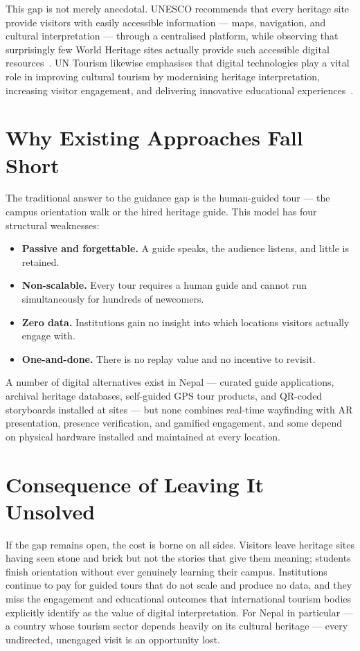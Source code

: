 This gap is not merely anecdotal. UNESCO recommends that every heritage site
provide visitors with easily accessible information --- maps, navigation, and
cultural interpretation --- through a centralised platform, while observing
that surprisingly few World Heritage sites actually provide such accessible
digital
resources~\cite{unescotoolkit}.
UN Tourism likewise emphasises that digital technologies play a vital role
in improving cultural tourism by modernising heritage interpretation,
increasing visitor engagement, and delivering innovative educational
experiences~\cite{unwto2018}.

\section{Why Existing Approaches Fall Short}
The traditional answer to the guidance gap is the human-guided tour --- the
campus orientation walk or the hired heritage guide. This model has four
structural weaknesses:

\begin{itemize}
  \item \textbf{Passive and forgettable.} A guide speaks, the audience
        listens, and little is retained.
  \item \textbf{Non-scalable.} Every tour requires a human guide and cannot
        run simultaneously for hundreds of newcomers.
  \item \textbf{Zero data.} Institutions gain no insight into which
        locations visitors actually engage with.
  \item \textbf{One-and-done.} There is no replay value and no incentive to
        revisit.
\end{itemize}

A number of digital alternatives exist in Nepal --- curated guide
applications, archival heritage databases, self-guided GPS tour products,
and QR-coded storyboards installed at sites --- but none combines real-time
wayfinding with AR presentation, presence verification, and gamified
engagement, and some depend on physical hardware installed and maintained at
every location.

\section{Consequence of Leaving It Unsolved}
If the gap remains open, the cost is borne on all sides. Visitors leave
heritage sites having seen stone and brick but not the stories that give
them meaning; students finish orientation without ever genuinely learning
their campus. Institutions continue to pay for guided tours that do not
scale and produce no data, and they miss the engagement and educational
outcomes that international tourism bodies explicitly identify as the value
of digital interpretation. For Nepal in particular --- a country whose
tourism sector depends heavily on its cultural heritage --- every
undirected, unengaged visit is an opportunity lost.

